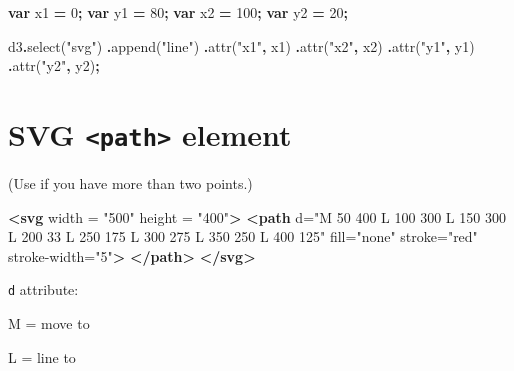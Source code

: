 \documentclass[
  openany]{book}
\newenvironment{Shaded}{\begin{snugshade}}{\end{snugshade}}
\newcommand{\DecValTok}[1]{\textcolor[rgb]{0.00,0.00,0.81}{#1}}
\newcommand{\FunctionTok}[1]{\textcolor[rgb]{0.00,0.00,0.00}{#1}}
\newcommand{\KeywordTok}[1]{\textcolor[rgb]{0.13,0.29,0.53}{\textbf{#1}}}
\newcommand{\NormalTok}[1]{#1}
\newcommand{\OperatorTok}[1]{\textcolor[rgb]{0.81,0.36,0.00}{\textbf{#1}}}
\newcommand{\OtherTok}[1]{\textcolor[rgb]{0.56,0.35,0.01}{#1}}
\newcommand{\StringTok}[1]{\textcolor[rgb]{0.31,0.60,0.02}{#1}}
\begin{document}
\begin{Shaded}
\begin{Highlighting}[]
\KeywordTok{var}\NormalTok{ x1 }\OperatorTok{=} \DecValTok{0}\OperatorTok{;}
\KeywordTok{var}\NormalTok{ y1 }\OperatorTok{=} \DecValTok{80}\OperatorTok{;}
\KeywordTok{var}\NormalTok{ x2 }\OperatorTok{=} \DecValTok{100}\OperatorTok{;}
\KeywordTok{var}\NormalTok{ y2 }\OperatorTok{=} \DecValTok{20}\OperatorTok{;}

\NormalTok{d3}\OperatorTok{.}\FunctionTok{select}\NormalTok{(}\StringTok{"svg"}\NormalTok{)}
  \OperatorTok{.}\FunctionTok{append}\NormalTok{(}\StringTok{"line"}\NormalTok{)}
  \OperatorTok{.}\FunctionTok{attr}\NormalTok{(}\StringTok{"x1"}\OperatorTok{,}\NormalTok{ x1)}
  \OperatorTok{.}\FunctionTok{attr}\NormalTok{(}\StringTok{"x2"}\OperatorTok{,}\NormalTok{ x2)}
  \OperatorTok{.}\FunctionTok{attr}\NormalTok{(}\StringTok{"y1"}\OperatorTok{,}\NormalTok{ y1)}
  \OperatorTok{.}\FunctionTok{attr}\NormalTok{(}\StringTok{"y2"}\OperatorTok{,}\NormalTok{ y2)}\OperatorTok{;}
\end{Highlighting}
\end{Shaded}

\hypertarget{svg-path-element}{%
\section{\texorpdfstring{SVG \texttt{\textless{}path\textgreater{}} element}{SVG \textless path\textgreater{} element}}\label{svg-path-element}}

(Use if you have more than two points.)

\begin{Shaded}
\begin{Highlighting}[]
\KeywordTok{\textless{}svg}\OtherTok{ width} \OtherTok{=} \StringTok{"500"}\OtherTok{ height} \OtherTok{=} \StringTok{"400"}\KeywordTok{\textgreater{}}
  \KeywordTok{\textless{}path}\OtherTok{ d=}\StringTok{"M 50 400 L 100 300 L 150 300 L 200 33 L 250 175}
\StringTok{     L 300 275 L 350 250 L 400 125"}\OtherTok{ fill=}\StringTok{"none"}
\OtherTok{      stroke=}\StringTok{"red"}\OtherTok{ stroke{-}width=}\StringTok{"5"}\KeywordTok{\textgreater{}}
  \KeywordTok{\textless{}/path\textgreater{}}
\KeywordTok{\textless{}/svg\textgreater{}}
\end{Highlighting}
\end{Shaded}

\texttt{d} attribute:

M = move to

L = line to
\end{document}
